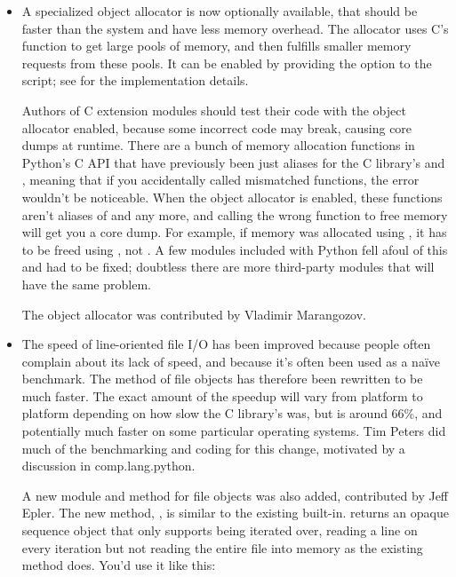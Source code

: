 \documentclass{howto}
\begin{document}
\begin{itemize}


\item A specialized object allocator is now optionally available, that
should be faster than the system  and have less
memory overhead.  The allocator uses C's  function
to get large pools of memory, and then fulfills smaller memory
requests from these pools.  It can be enabled by providing the
 option to the  script; see
 for the implementation details.  

Authors of C extension modules should test their code with the object
allocator enabled, because some incorrect code may break, causing core
dumps at runtime.  There are a bunch of memory allocation functions in
Python's C API that have previously been just aliases for the C
library's  and , meaning that if
you accidentally called mismatched functions, the error wouldn't be
noticeable.  When the object allocator is enabled, these functions
aren't aliases of  and  any more,
and calling the wrong function to free memory will get you a core
dump.  For example, if memory was allocated using
, it has to be freed using
, not .  A few modules included
with Python fell afoul of this and had to be fixed; doubtless there
are more third-party modules that will have the same problem.

The object allocator was contributed by Vladimir Marangozov.

\item The speed of line-oriented file I/O has been improved because
people often complain about its lack of speed, and because it's often
been used as a na\"ive benchmark.  The  method of
file objects has therefore been rewritten to be much faster.  The
exact amount of the speedup will vary from platform to platform
depending on how slow the C library's  was, but is
around 66\%, and potentially much faster on some particular operating
systems.  Tim Peters did much of the benchmarking and coding for this
change, motivated by a discussion in comp.lang.python.

A new module and method for file objects was also added, contributed
by Jeff Epler. The new method, , is similar to
the existing  built-in.  
returns an opaque sequence object that only supports being iterated
over, reading a line on every iteration but not reading the entire
file into memory as the existing  method does.
You'd use it like this:


\end{itemize}
\end{document}
